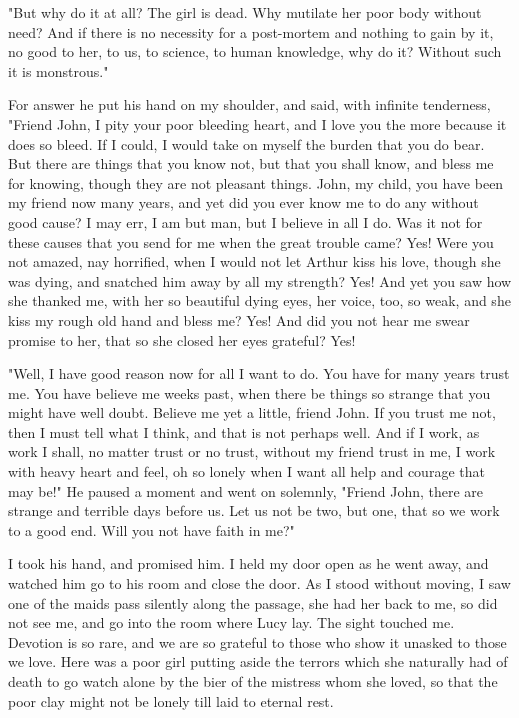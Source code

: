 "But why do it at all? The girl is dead. Why mutilate her poor body without need? And if there is no necessity for a post-mortem and nothing to gain by it, no good to her, to us, to science, to human knowledge, why do it? Without such it is monstrous." 

For answer he put his hand on my shoulder, and said, with infinite tenderness, "Friend John, I pity your poor bleeding heart, and I love you the more because it does so bleed. If I could, I would take on myself the burden that you do bear. But there are things that you know not, but that you shall know, and bless me for knowing, though they are not pleasant things. John, my child, you have been my friend now many years, and yet did you ever know me to do any without good cause? I may err, I am but man, but I believe in all I do. Was it not for these causes that you send for me when the great trouble came? Yes! Were you not amazed, nay horrified, when I would not let Arthur kiss his love, though she was dying, and snatched him away by all my strength? Yes! And yet you saw how she thanked me, with her so beautiful dying eyes, her voice, too, so weak, and she kiss my rough old hand and bless me? Yes! And did you not hear me swear promise to her, that so she closed her eyes grateful? Yes! 

"Well, I have good reason now for all I want to do. You have for many years trust me. You have believe me weeks past, when there be things so strange that you might have well doubt. Believe me yet a little, friend John. If you trust me not, then I must tell what I think, and that is not perhaps well. And if I work, as work I shall, no matter trust or no trust, without my friend trust in me, I work with heavy heart and feel, oh so lonely when I want all help and courage that may be!" He paused a moment and went on solemnly, "Friend John, there are strange and terrible days before us. Let us not be two, but one, that so we work to a good end. Will you not have faith in me?" 

I took his hand, and promised him. I held my door open as he went away, and watched him go to his room and close the door. As I stood without moving, I saw one of the maids pass silently along the passage, she had her back to me, so did not see me, and go into the room where Lucy lay. The sight touched me. Devotion is so rare, and we are so grateful to those who show it unasked to those we love. Here was a poor girl putting aside the terrors which she naturally had of death to go watch alone by the bier of the mistress whom she loved, so that the poor clay might not be lonely till laid to eternal rest. 

